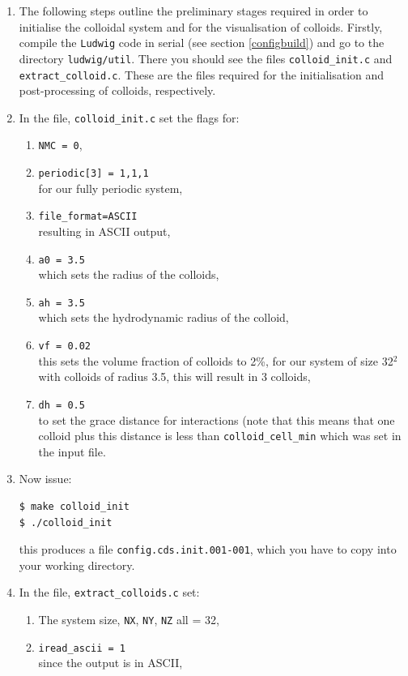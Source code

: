 \documentclass[11pt,twoside,a4paper]{article}
\begin{document}
\begin{enumerate}
\item The following steps outline the preliminary stages required in order to initialise the colloidal system and for the visualisation of colloids. Firstly, compile the \texttt{Ludwig} code in serial (see section \ref{configbuild}) and go to the directory \texttt{ludwig/util}. There you should see the files \texttt{colloid\_init.c} and \texttt{extract\_colloid.c}. These are the files required for the initialisation and post-processing of colloids, respectively.
\item In the file, \texttt{colloid\_init.c} set the flags for:
\begin{enumerate}
\item \texttt{NMC = 0},
\item \texttt{periodic[3] = {1,1,1}} \\ for our fully periodic system,
\item \texttt{file\_format=ASCII} \\ resulting in ASCII output,
\item \texttt{a0 = 3.5} \\ which sets the radius of the colloids,
\item \texttt{ah = 3.5} \\ which sets the hydrodynamic radius of the colloid,
\item \texttt{vf = 0.02} \\ this sets the volume fraction of colloids to 2\%, for our system of size 32$^2$ with colloids of radius 3.5, this will result in 3 colloids,
\item \texttt{dh = 0.5} \\ to set the grace distance for interactions (note that this means that one colloid plus this distance is less than \texttt{colloid\_cell\_min} which was set in the input file.
\end{enumerate}
\item Now issue: \\
\begin{lstlisting}
$ make colloid_init
$ ./colloid_init
\end{lstlisting}
this produces a file \texttt{config.cds.init.001-001}, which you have to copy into your working directory.
\item In the file, \texttt{extract\_colloids.c} set:
\begin{enumerate}
\item The system size, \texttt{NX},  \texttt{NY},  \texttt{NZ} all = 32,
\item \texttt{iread\_ascii = 1} \\ since the output is in ASCII,

\end{enumerate}
\end{enumerate}
\end{document}
